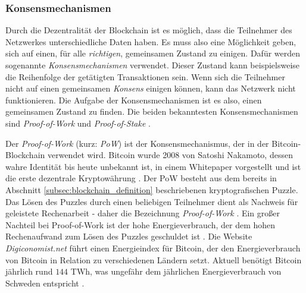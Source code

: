 \subsubsection{Konsensmechanismen}
\label{consensus_mechanisms}

Durch die Dezentralität der Blockchain ist es möglich, dass die Teilnehmer des Netzwerkes unterschiedliche Daten haben. Es muss also eine Möglichkeit geben, sich auf einen, für alle \textit{richtigen}, gemeinsamen Zustand zu einigen. Dafür werden sogenannte \textit{Konsensmechanismen} verwendet. Dieser Zustand kann beispielsweise die Reihenfolge der getätigten Transaktionen sein. Wenn sich die Teilnehmer nicht auf einen gemeinsamen \textit{Konsens} einigen können, kann das Netzwerk nicht funktionieren. Die Aufgabe der Konsensmechanismen ist es also, einen gemeinsamen Zustand zu finden. Die beiden bekanntesten Konsensmechanismen sind \textit{Proof-of-Work} und \textit{Proof-of-Stake} \parencite[S. 87]{Alam_BlockchainConsensusMechanism}.

Der \textit{Proof-of-Work} (kurz: \textit{PoW}) ist der Konsensmechanismus, der in der Bitcoin-Blockchain verwendet wird. Bitcoin wurde 2008 von Satoshi Nakamoto, dessen wahre Identität bis heute unbekannt ist, in einem Whitepaper vorgestellt und ist die erste dezentrale Kryptowährung \parencites{Nakamoto_Bitcoin}{Zhang_DoubleSpendingWithASybilAttack}. Der PoW besteht aus dem bereits in Abschnitt \ref{subsec:blockchain_definition} \textit{} beschriebenen kryptografischen Puzzle. Das Lösen des Puzzles durch einen beliebigen Teilnehmer dient als Nachweis für geleistete Rechenarbeit - daher die Bezeichnung \textit{Proof-of-Work} \parencite[S. 27]{Brünnler_BlockchainKurzGut}. Ein großer Nachteil bei Proof-of-Work ist der hohe Energieverbrauch, der dem hohen Rechenaufwand zum Lösen des Puzzles geschuldet ist \parencite{Zhang_EvaluationOfEnergyConsumptionInBlockChains}. Die Website \textit{Digiconomist.net} führt einen Energieindex für Bitcoin, der den Energieverbrauch von Bitcoin in Relation zu verschiedenen Ländern setzt. Aktuell benötigt Bitcoin jährlich rund $144$ TWh, was ungefähr dem jährlichen Energieverbrauch von Schweden entspricht \parencite{Digiconomist_BitcoinEnergyConsumption}.

